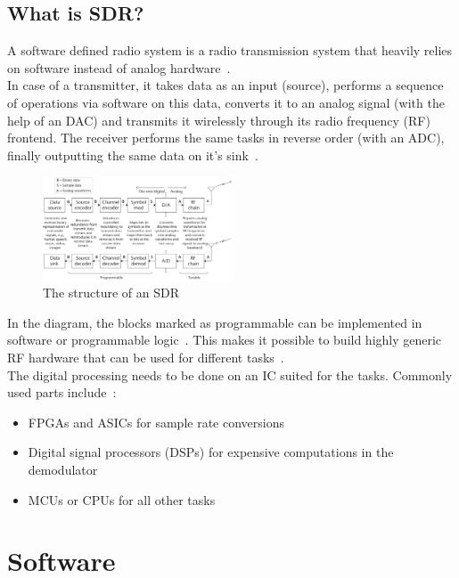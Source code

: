 \documentclass[conference]{IEEEtran}
\begin{document}
\subsection{What is SDR?}
A software defined radio system is a radio transmission system that heavily relies on software instead of analog hardware~\cite[1]{Heuberger2017}.\\
In case of a transmitter, it takes data as an input (source), performs a sequence of operations via software on this data, converts it to an analog signal (with the help of an DAC) and transmits it wirelessly through its radio frequency (RF) frontend. The receiver performs the same tasks in reverse order (with an ADC), finally outputting the same data on it's sink~\cite[5-6]{wyglinski2018software}.
\begin{figure}[H]
	\centering
	\includegraphics[width=0.5\textwidth]{forEngineers_SDR_structure}
	\caption{The structure of an SDR}
\end{figure}
In the diagram, the blocks marked as programmable can be implemented in software or programmable logic~\cite[5]{wyglinski2018software}. This makes it possible to build highly generic RF hardware that can be used for different tasks~\cite[4]{wyglinski2018software}.\\
The digital processing needs to be done on an IC suited for the tasks. Commonly used parts include~\cite[3]{Heuberger2017}:
\begin{itemize}
	\item FPGAs and ASICs for sample rate conversions
	\item Digital signal processors (DSPs) for expensive computations in the demodulator
	\item MCUs or CPUs for all other tasks
\end{itemize}

\section{Software} %
\end{document}
